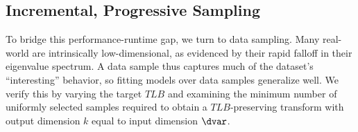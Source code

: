 \begin{comment}
\subsection{PCA Speed vs. Quality}

While improved quality provides faster repeated query execution, the cost of DR via PCA dominates this speedup, encouraging the use of faster, lower-quality alternatives~\cite{keogh-study}. 

To briefly quantify this trade-off, we augment a widely-cited time series similarity search DR study from VLDB 2008~\cite{keogh-study} by evaluating PCA---which the authors did not benchmark due to it being ``untenable for large data sets." 
We compare PCA via SVD to baseline techniques based on runtime and DR performance with respect to $TLB$ over the largest datasets from~\cite{keogh-study}. 
We use their two fastest methods as our baselines as they show the remainder exhibited ``very little difference'': Fast Fourier Transform (FFT) and Piecewise Aggregate Approximation (PAA).

\minihead{TLB Performance Comparison}
We compute the minimum dimensionality achieved by each technique subject to a $TLB$ constraint. 
On average, PCA provides bases that are $2.3\times$ (up to $3.9\times$) and $3.7\times$ (up to $26\times$)  smaller than PAA and FFT for $TLB = 0.75$, and $2.9\times$ (up to $8.3\times$) and $1.8\times$ (up to $5.1\times$) smaller for $TLB = 0.99$.
While the margin between PCA and alternatives is dataset-dependent, PCA almost always preserves $TLB$ with a lower dimensional representation.

%

\minihead{Runtime Performance Comparison} 
PCA implemented via out-of-the-box SVD is on average over \red{$26\times$ (up to $56\times$)} slower than PAA and over \red{$4.6\times$ (up to $9.7\times$)} times slower than FFT when computing the smallest $TLB$-preserving basis.

\end{comment}

\subsection{Incremental, Progressive Sampling}
To bridge this performance-runtime gap, we turn to data sampling. 
Many real-world  are intrinsically low-dimensional, as evidenced by their rapid falloff in their eigenvalue spectrum.
A data sample thus captures much of the dataset's ``interesting'' behavior, so fitting models over data samples generalize well. 
We verify this by varying the target $TLB$ and examining the minimum number of uniformly selected samples required to obtain a $TLB$-preserving transform with output dimension $k$ equal to input dimension $\dvar$.

